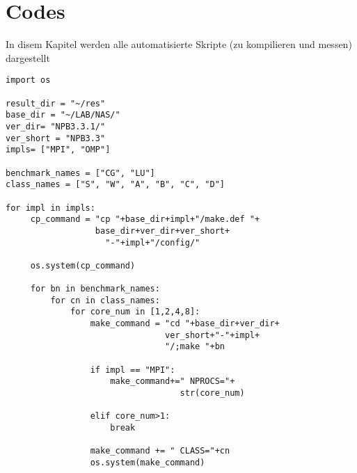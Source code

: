 \chapter{Codes}
\label{chap:Codes}

In disem Kapitel werden alle automatisierte Skripte (zu kompilieren und messen) dargestellt

\begin{lstlisting}[label=lst:compile.py, caption={compile.py}]
import os

result_dir = "~/res"
base_dir = "~/LAB/NAS/"
ver_dir= "NPB3.3.1/"
ver_short = "NPB3.3"
impls= ["MPI", "OMP"]

benchmark_names = ["CG", "LU"]
class_names = ["S", "W", "A", "B", "C", "D"]

for impl in impls:
     cp_command = "cp "+base_dir+impl+"/make.def "+
     			  base_dir+ver_dir+ver_short+
     			  	"-"+impl+"/config/"

     os.system(cp_command)

     for bn in benchmark_names:
         for cn in class_names:
             for core_num in [1,2,4,8]:
                 make_command = "cd "+base_dir+ver_dir+
                                ver_short+"-"+impl+
                                "/;make "+bn

                 if impl == "MPI":
                     make_command+=" NPROCS="+
                                   str(core_num)

                 elif core_num>1:
                     break

                 make_command += " CLASS="+cn
                 os.system(make_command)
\end{lstlisting}

